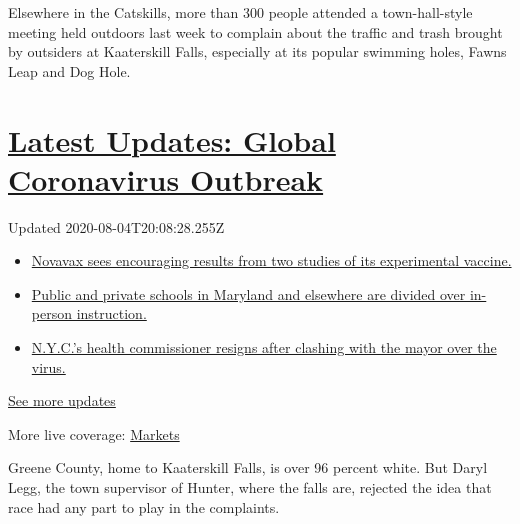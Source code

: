 Elsewhere in the Catskills, more than 300 people attended a
town-hall-style meeting held outdoors last week to complain about the
traffic and trash brought by outsiders at Kaaterskill Falls, especially
at its popular swimming holes, Fawns Leap and Dog Hole.

\hypertarget{latest-updates-global-coronavirus-outbreak}{%
\section{\texorpdfstring{\href{https://www.nytimes.com/2020/08/04/world/coronavirus-cases.html?action=click\&pgtype=Article\&state=default\&region=MAIN_CONTENT_1\&context=storylines_live_updates}{Latest
Updates: Global Coronavirus
Outbreak}}{Latest Updates: Global Coronavirus Outbreak}}\label{latest-updates-global-coronavirus-outbreak}}

Updated 2020-08-04T20:08:28.255Z

\begin{itemize}
\tightlist
\item
  \href{https://www.nytimes.com/2020/08/04/world/coronavirus-cases.html?action=click\&pgtype=Article\&state=default\&region=MAIN_CONTENT_1\&context=storylines_live_updates\#link-1228a480}{Novavax
  sees encouraging results from two studies of its experimental
  vaccine.}
\item
  \href{https://www.nytimes.com/2020/08/04/world/coronavirus-cases.html?action=click\&pgtype=Article\&state=default\&region=MAIN_CONTENT_1\&context=storylines_live_updates\#link-4825b93}{Public
  and private schools in Maryland and elsewhere are divided over
  in-person instruction.}
\item
  \href{https://www.nytimes.com/2020/08/04/world/coronavirus-cases.html?action=click\&pgtype=Article\&state=default\&region=MAIN_CONTENT_1\&context=storylines_live_updates\#link-4d1eafa8}{N.Y.C.'s
  health commissioner resigns after clashing with the mayor over the
  virus.}
\end{itemize}

\href{https://www.nytimes.com/2020/08/04/world/coronavirus-cases.html?action=click\&pgtype=Article\&state=default\&region=MAIN_CONTENT_1\&context=storylines_live_updates}{See
more updates}

More live coverage:
\href{https://www.nytimes.com/live/2020/08/04/business/stock-market-today-coronavirus?action=click\&pgtype=Article\&state=default\&region=MAIN_CONTENT_1\&context=storylines_live_updates}{Markets}

Greene County, home to Kaaterskill Falls, is over 96 percent white. But
Daryl Legg, the town supervisor of Hunter, where the falls are, rejected
the idea that race had any part to play in the complaints.

